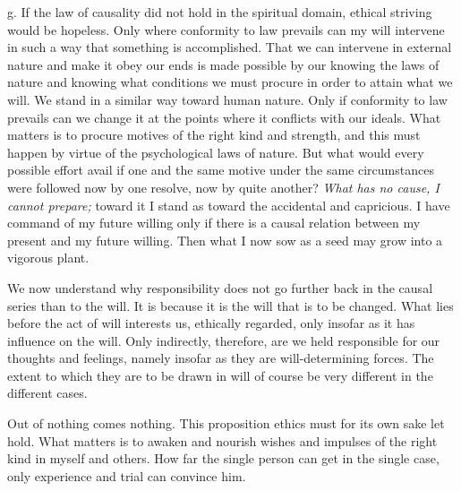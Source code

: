 \documentclass[12pt,a4paper,openany]{book}
\newcommand{\opage}[1]{\marginnote{\footnotesize\textit{[#1]}}}
\begin{document}
g. If the law of causality did not hold in the spiritual domain, ethical striving would be hopeless. Only
where conformity to law prevails can my will intervene in such a way that something is accomplished. That
we can intervene in external nature and make it obey our ends is made possible by our knowing the laws of
nature and knowing what conditions we must procure in order to attain what we will. We stand in a similar
way toward human nature. Only if conformity to law prevails can we change it at the points where it
conflicts with our ideals. What matters is to procure motives of the right kind and strength, and this must
happen by virtue of the psychological laws of nature. But what would every possible effort avail if one
and the same motive under the same circumstances were followed now by one resolve, now by quite another?
\textit{What has no cause, I cannot prepare;} toward it I stand as toward the accidental and capricious. I
have command of my future willing only if there is a causal relation between my present and my future
willing. Then what I now sow as a seed may grow into a vigorous plant.

We now understand why responsibility does not go further back in the causal series than to the will. It is
because it is the will that is to be changed. What lies before the act of will interests us, ethically
regarded, only insofar as it has influence on the will. Only indirectly, therefore, are we held responsible
for our thoughts and feelings, namely insofar as they are will-determining forces. The extent to which they
are to be drawn in will of course be very different in the different cases.

Out of nothing comes nothing. This proposition ethics must for its own sake let hold. What matters is to
awaken and nourish wishes and impulses of the right kind in myself and others. How
\opage{124}far the single person can get in the single case, only experience and trial can convince him.
\end{document}
